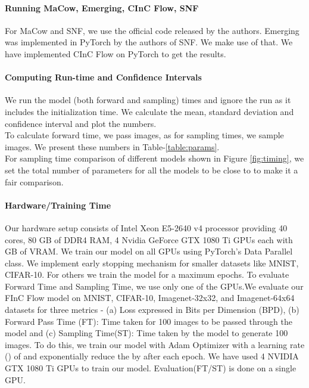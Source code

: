 \documentclass[a4paper,twoside]{article}
\theoremstyle{definition}
\begin{document}
\paragraph{Running MaCow, Emerging, CInC Flow, SNF}
For MaCow and SNF, we use the official code released by the authors. Emerging was implemented in PyTorch by the authors of SNF. We make use of that. We have implemented CInC Flow on PyTorch to get the results.

\paragraph{Computing Run-time and Confidence Intervals}
We run the model (both forward and sampling)  times and ignore the  run as it includes the initialization time. We calculate the mean, standard deviation and  confidence interval and plot the numbers. 
\\
To calculate forward time, we pass  images, as for sampling times, we sample  images. We present these numbers in Table-\ref{table:params}.
\\
For sampling time comparison of different models shown in Figure \ref{fig:timing}, we set the total number of parameters for all the models to be close to  to make it a fair comparison. 

\paragraph{Hardware/Training Time}
Our hardware setup consists of Intel Xeon E5-2640 v4 processor providing 40 cores, 80 GB of DDR4 RAM, 4 Nvidia GeForce GTX 1080 Ti GPUs each with  GB of VRAM. We train our model on all GPUs using PyTorch's Data Parallel class. We implement early stopping mechanism for smaller datasets like MNIST, CIFAR-10. For others we train the model for a maximum epochs. To evaluate Forward Time and Sampling Time, we use only one of the GPUs.We evaluate our FInC Flow model on MNIST, CIFAR-10, Imagenet-32x32, and Imagenet-64x64 datasets for three metrics - (a) Loss expressed in Bits per Dimension (BPD), (b) Forward Pass Time (FT): Time taken for 100 images to be passed through the model and (c) Sampling Time(ST): Time taken by the model to generate 100 images.  To do this, we train our model with Adam Optimizer with a learning rate () of  and exponentially reduce the  by  after each epoch. We have used 4 NVIDIA GTX 1080 Ti GPUs to train our model. Evaluation(FT/ST) is done on a single GPU.
 
\end{document}
